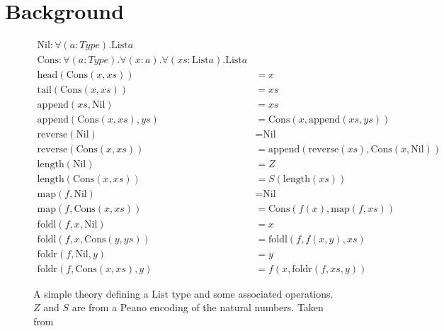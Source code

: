 
\section{Background}
\label{sec:background}

\begin{figure}
  \label{figure:list_theory}
  \begin{equation*}
    \begin{split}
      \text{Nil} : \forall (a : Type). \text{List} a \\
      \text{Cons} : \forall (a : Type). \forall (x : a). \forall (xs : \text{List} a). \text{List} a \\
      \text{head}(\text{Cons}(x, xs)) &= x \\
      \text{tail}(\text{Cons}(x, xs)) &= xs \\
      \text{append}(xs, \text{Nil}) &= xs \\
      \text{append}(\text{Cons}(x, xs), ys) &= \text{Cons}(x, \text{append}(xs, ys)) \\
      \text{reverse}(\text{Nil}) &= \text{Nil} \\
      \text{reverse}(\text{Cons}(x, xs)) &= \text{append}(\text{reverse}(xs), \text{Cons}(x, \text{Nil})) \\
      \text{length}(\text{Nil}) &= Z \\
      \text{length}(\text{Cons}(x, xs)) &= S (\text{length}(xs)) \\
      \text{map}(f, \text{Nil}) &= \text{Nil} \\
      \text{map}(f, \text{Cons}(x, xs)) &= \text{Cons}(f(x), \text{map}(f, xs)) \\
      \text{foldl}(f, x, \text{Nil}) &= x \\
      \text{foldl}(f, x, \text{Cons}(y, ys)) &= \text{foldl}(f, f(x, y), xs) \\
      \text{foldr}(f, \text{Nil}, y) &= y \\
      \text{foldr}(f, \text{Cons}(x, xs), y) &= f(x, \text{foldr}(f, xs, y))
    \end{split}
  \end{equation*}
  \caption{A simple theory defining a $\text{List}$ type and some associated
    operations. $Z$ and $S$ are from a Peano encoding of the natural numbers.
    Taken from \cite{Johansson.Dixon.Bundy:conjecture-generation}}
\end{figure}

